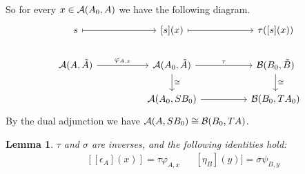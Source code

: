 \documentclass[12pt,a4paper]{article}
\newtheorem{lemma}{Lemma}[section] %
\def\HomA{\ensuremath\mathcal{A}}
\def\HomB{\ensuremath\mathcal{B}}
\def\t{\ensuremath\tilde}
\begin{document}
So for every $x \in \HomA(A_0,  A)$ we have the following diagram.
\[\begin{tikzcd}
	s && {[s](x)} && {\tau([s](x))} \\
	\HomA(A, \t A) && \HomA(A_0, \t A) && \HomB(B_0, \t B) \\
	&& \HomA(A_0, SB_0) && \HomB(B_0, TA_0)
	\arrow[maps to, from=1-1, to=1-3]
	\arrow[maps to, from=1-3, to=1-5]
	\arrow["\varphi_{A,x}", from=2-1, to=2-3]
	\arrow["\tau", from=2-3, to=2-5]
	\arrow["\cong",from=2-3, to=3-3]
	\arrow["\cong",from=2-5, to=3-5]
	\arrow[from=3-3, to=3-5]
\end{tikzcd}\]
By the dual adjunction we have $\HomA(A, SB_0) \cong \HomB(B_0, TA)$.




\begin{lemma}
	$\tau$ and $\sigma$ are inverses, and the following identities hold:
	\begin{align*}
		&[[\epsilon_A](x)] = \tau \varphi_{A,x}& & [\eta_B](y)]= \sigma \psi_{B,y}
	\end{align*}
\end{lemma}
\end{document}
